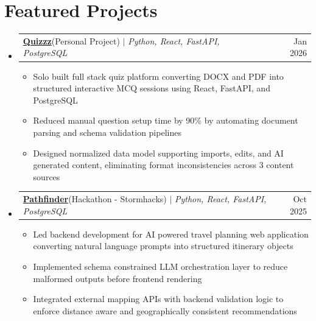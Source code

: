 \documentclass[letterpaper, 11pt]{article}
\makeatletter
\newcommand{\resumeItem}[1]{
  \item\small{
    {#1 \vspace{-2pt}}
  }
}
\newcommand{\resumeProjectHeading}[2]{
    \item
    \begin{tabular*}{0.97\textwidth}{l@{\extracolsep{\fill}}r}
      \small#1 & #2 \\
    \end{tabular*}\vspace{-7pt}
}
\newcommand{\resumeSubHeadingListStart}{\begin{itemize}[leftmargin=0.15in, label={}]}
\newcommand{\resumeSubHeadingListEnd}{\end{itemize}}
\newcommand{\resumeItemListStart}{\begin{itemize}}
\newcommand{\resumeItemListEnd}{\end{itemize}\vspace{-5pt}}
\makeatother
\begin{document}
\section{Featured Projects}
\resumeSubHeadingListStart
\resumeProjectHeading
{\href{https://www.jameshoang.com/quizzz}{\faLink \hspace{1pt} \textbf{Quizzz}}\hspace{3pt}(Personal Project) $|$ \emph{Python, React, FastAPI, PostgreSQL}}{Jan 2026}
\resumeItemListStart
\resumeItem{Solo built full stack quiz platform converting DOCX and PDF into structured interactive MCQ sessions using React, FastAPI, and PostgreSQL}
\resumeItem{Reduced manual question setup time by 90\% by automating document parsing and schema validation pipelines}
\resumeItem{Designed normalized data model supporting imports, edits, and AI generated content, eliminating format inconsistencies across 3 content sources}
\resumeItemListEnd
\resumeProjectHeading
{\href{https://www.jameshoang.com/pathfinder}{\faLink \hspace{1pt} \textbf{Pathfinder}}\hspace{3pt}(Hackathon - Stormhacks) $|$ \emph{Python, React, FastAPI, PostgreSQL}}{Oct 2025}
\resumeItemListStart
\resumeItem{Led backend development for AI powered travel planning web application converting natural language prompts into structured itinerary objects}
\resumeItem{Implemented schema constrained LLM orchestration layer to reduce malformed outputs before frontend rendering}
\resumeItem{Integrated external mapping APIs with backend validation logic to enforce distance aware and geographically consistent recommendations}
\resumeItemListEnd
\resumeSubHeadingListEnd
\end{document}
